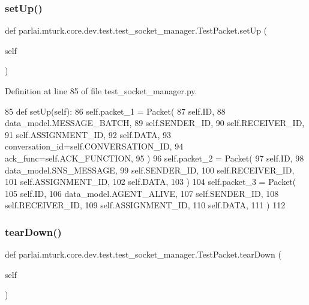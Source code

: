 \subsubsection{\texorpdfstring{set\+Up()}{setUp()}}
{\footnotesize\ttfamily def parlai.\+mturk.\+core.\+dev.\+test.\+test\+\_\+socket\+\_\+manager.\+Test\+Packet.\+set\+Up (\begin{DoxyParamCaption}\item[{}]{self }\end{DoxyParamCaption})}



Definition at line 85 of file test\+\_\+socket\+\_\+manager.\+py.


\begin{DoxyCode}
85     \textcolor{keyword}{def }setUp(self):
86         self.packet\_1 = Packet(
87             self.ID,
88             data\_model.MESSAGE\_BATCH,
89             self.SENDER\_ID,
90             self.RECEIVER\_ID,
91             self.ASSIGNMENT\_ID,
92             self.DATA,
93             conversation\_id=self.CONVERSATION\_ID,
94             ack\_func=self.ACK\_FUNCTION,
95         )
96         self.packet\_2 = Packet(
97             self.ID,
98             data\_model.SNS\_MESSAGE,
99             self.SENDER\_ID,
100             self.RECEIVER\_ID,
101             self.ASSIGNMENT\_ID,
102             self.DATA,
103         )
104         self.packet\_3 = Packet(
105             self.ID,
106             data\_model.AGENT\_ALIVE,
107             self.SENDER\_ID,
108             self.RECEIVER\_ID,
109             self.ASSIGNMENT\_ID,
110             self.DATA,
111         )
112 
\end{DoxyCode}
\mbox{\label{classparlai_1_1mturk_1_1core_1_1dev_1_1test_1_1test__socket__manager_1_1TestPacket_a53b156f37e22aac47f19019f8b46cad6}} 
\subsubsection{\texorpdfstring{tear\+Down()}{tearDown()}}
{\footnotesize\ttfamily def parlai.\+mturk.\+core.\+dev.\+test.\+test\+\_\+socket\+\_\+manager.\+Test\+Packet.\+tear\+Down (\begin{DoxyParamCaption}\item[{}]{self }\end{DoxyParamCaption})}



